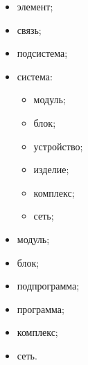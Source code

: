 \begin{itemize}


\item элемент;\\[-14pt]


\item связь;\\[-14pt]


\item подсистема;\\[-14pt]


\item система:


\begin{itemize}


\item модуль;\\[-14pt]


\item блок;\\[-14pt]


\item устройство;\\[-14pt]


\item изделие;\\[-14pt]


\item комплекс;\\[-14pt]


\item сеть;


\end{itemize}


\item модуль;\\[-14pt]


\item блок;\\[-14pt]


\item подпрограмма;\\[-14pt]


\item программа;\\[-14pt]


\item комплекс;\\[-14pt]


\item сеть.


\end{itemize}





